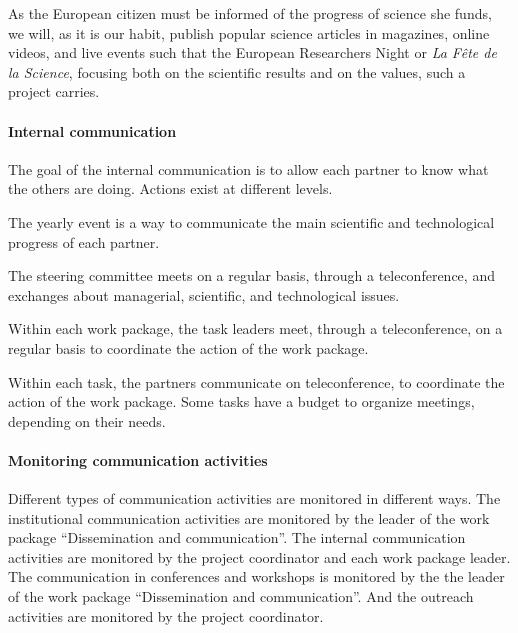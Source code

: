 As the European citizen must be informed of the progress of science
she funds, we will, as it is our habit, publish popular science
articles in magazines, online videos, and live events such that the
European Researchers Night or {\em La Fête de la Science}, focusing
both on the scientific results and on the values, such a project
carries.


\paragraph*{Internal communication}

The goal of the internal communication is to allow each partner to
know what the others are doing. Actions exist at different levels.

\begin{compactitem}
\item The yearly event is a way to communicate the main scientific and
  technological progress of each partner.
\item The steering committee meets on a regular basis, through a
  teleconference, and exchanges about managerial, scientific, and
  technological issues.
\item Within each work package, the task leaders meet, through a
  teleconference, on a regular basis to coordinate the action of the
  work package.
\item Within each task, the partners communicate on teleconference, to
  coordinate the action of the work package. Some tasks have a budget
  to organize meetings, depending on their needs.
\end{compactitem}

\paragraph*{Monitoring communication activities}

Different types of communication activities are monitored in
different ways.  The institutional communication activities are
monitored by the leader of the work package ``Dissemination and
communication''. The internal communication activities are monitored
by the project coordinator and each work package leader. The communication
in conferences and workshops is monitored by the
the leader of the work package ``Dissemination and
communication''. And the outreach activities are monitored by the
project coordinator.

